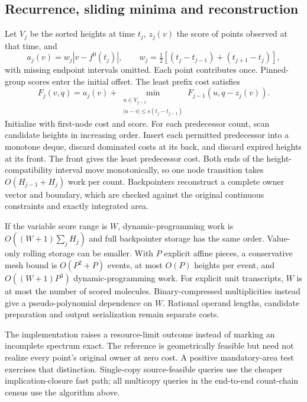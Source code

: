 \documentclass[10pt,letterpaper]{article}
\begin{document}
\FloatBarrier
\subsection{Recurrence, sliding minima and reconstruction}
Let $V_j$ be the sorted heights at time $t_j$, $z_j(v)$ the score of points observed at that time, and
\[
 a_j(v)=w_j|v-f^0(t_j)|,\qquad
 w_j=\tfrac12[(t_j-t_{j-1})+(t_{j+1}-t_j)],
\]
with missing endpoint intervals omitted. Each point contributes once. Pinned-group scores enter the initial offset. The least prefix cost satisfies
\[
 F_j(v,q)=a_j(v)+
 \min_{\substack{u\in V_{j-1}\\|u-v|\le s(t_j-t_{j-1})}}
 F_{j-1}(u,q-z_j(v)).
\]
Initialize with first-node cost and score. For each predecessor count, scan candidate heights in increasing order. Insert each permitted predecessor into a monotone deque, discard dominated costs at its back, and discard expired heights at its front. The front gives the least predecessor cost. Both ends of the height-compatibility interval move monotonically, so one node transition takes $O(H_{j-1}+H_j)$ work per count. Backpointers reconstruct a complete owner vector and boundary, which are checked against the original continuous constraints and exactly integrated area.

If the variable score range is $W$, dynamic-programming work is $O((W+1)\sum_jH_j)$ and full backpointer storage has the same order. Value-only rolling storage can be smaller. With $P$ explicit affine pieces, a conservative mesh bound is $O(P^2+P)$ events, at most $O(P)$ heights per event, and $O((W+1)P^3)$ dynamic-programming work. For explicit unit transcripts, $W$ is at most the number of scored molecules. Binary-compressed multiplicities instead give a pseudo-polynomial dependence on $W$. Rational operand lengths, candidate preparation and output serialization remain separate costs.

The implementation raises a resource-limit outcome instead of marking an incomplete spectrum exact. The reference is geometrically feasible but need not realize every point's original owner at zero cost. A positive mandatory-area test exercises that distinction. Single-copy source-feasible queries use the cheaper implication-closure fast path; all multicopy queries in the end-to-end count-chain census use the algorithm above.

\FloatBarrier
\end{document}
